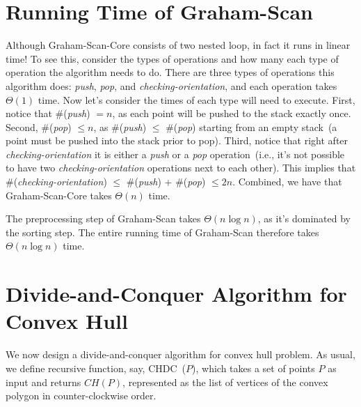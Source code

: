 \section*{Running Time of Graham-Scan}

Although Graham-Scan-Core consists of two nested loop, in fact it runs in linear time!
To see this, consider the types of operations and how many each type of operation
the algorithm needs to do.  There are three types of operations this algorithm does: \emph{push}, \emph{pop}, and \emph{checking-orientation},
and each operation takes $\Theta(1)$ time. Now let's consider the times of each type will need to execute.
First, notice that \#(\emph{push}) $= n$, as each point will be pushed to the stack exactly once.
Second, \#(\emph{pop}) $\le n$, as \#(\emph{push}) $\le$ \#(\emph{pop}) starting from an empty stack~(a point must be pushed into the stack prior to pop).
Third, notice that right after \emph{checking-orientation} it is either a \emph{push} or a \emph{pop} operation~(i.e.,
it's not possible to have two \emph{checking-orientation} operations next to each other).
This implies that \#(\emph{checking-orientation}) $\le$ \#(\emph{push}) + \#(\emph{pop}) $\le 2n$.
Combined, we have that Graham-Scan-Core takes $\Theta(n)$ time.

The preprocessing step of Graham-Scan takes $\Theta(n \log n)$, as it's dominated by the sorting step.
The entire running time of Graham-Scan therefore takes $\Theta(n \log n)$ time.

\section*{Divide-and-Conquer Algorithm for Convex Hull}

We now design a divide-and-conquer algorithm for convex hull problem.
As usual, we define recursive function, say, CHDC~($P$), which takes
a set of points $P$ as input and returns $CH(P)$, represented
as the list of vertices of the convex polygon in counter-clockwise order.

\begin{minipage}{0.8\textwidth}
	\xxx
	\xxx
	\xxx
	\xxx
	\xxx
	\xxx
\end{minipage}

